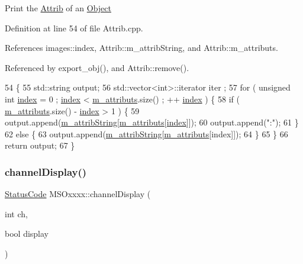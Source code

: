 Print the \hyperlink{classAttrib}{Attrib} of an \hyperlink{classObject}{Object} 

Definition at line 54 of file Attrib.\+cpp.



References images\+::index, Attrib\+::m\+\_\+attrib\+String, and Attrib\+::m\+\_\+attributs.



Referenced by export\+\_\+obj(), and Attrib\+::remove().


\begin{DoxyCode}
54                             \{
55   std::string output;
56   std::vector<int>::iterator iter ;
57   \textcolor{keywordflow}{for} ( \textcolor{keywordtype}{unsigned} \textcolor{keywordtype}{int} \hyperlink{namespaceimages_a54407fd574970b3178647ae096321a57}{index} = 0 ; \hyperlink{namespaceimages_a54407fd574970b3178647ae096321a57}{index} < \hyperlink{classAttrib_ac4bd58a0cc6b38a3b711d609a3d3aacc}{m\_attributs}.size() ; ++
      \hyperlink{namespaceimages_a54407fd574970b3178647ae096321a57}{index} ) \{
58     \textcolor{keywordflow}{if} ( \hyperlink{classAttrib_ac4bd58a0cc6b38a3b711d609a3d3aacc}{m\_attributs}.size() - \hyperlink{namespaceimages_a54407fd574970b3178647ae096321a57}{index} > 1 ) \{
59       output.append(\hyperlink{classAttrib_a3414521d7a82476e874b25a5407b5e63}{m\_attribString}[\hyperlink{classAttrib_ac4bd58a0cc6b38a3b711d609a3d3aacc}{m\_attributs}[\hyperlink{namespaceimages_a54407fd574970b3178647ae096321a57}{index}]]);
60       output.append(\textcolor{stringliteral}{":"});
61     \}
62     \textcolor{keywordflow}{else} \{
63       output.append(\hyperlink{classAttrib_a3414521d7a82476e874b25a5407b5e63}{m\_attribString}[\hyperlink{classAttrib_ac4bd58a0cc6b38a3b711d609a3d3aacc}{m\_attributs}[index]]);
64     \}
65   \}
66   \textcolor{keywordflow}{return} output;
67 \}
\end{DoxyCode}
\mbox{\label{classMSOxxxx_a4cb8e745f172b7a30953ec87923c8c76}} 
\subsubsection{\texorpdfstring{channel\+Display()}{channelDisplay()}}
{\footnotesize\ttfamily \hyperlink{classStatusCode}{Status\+Code} M\+S\+Oxxxx\+::channel\+Display (\begin{DoxyParamCaption}\item[{int}]{ch,  }\item[{bool}]{display }\end{DoxyParamCaption})}



